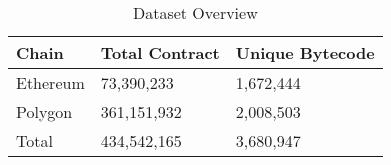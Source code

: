 \begin{table}[t]
	\centering
	\footnotesize
	\caption{Dataset Overview}
	\label{tab:dataset}
	\begin{tabularx}
		{0.6\linewidth}{@{}lRR@{}} \toprule \textbf{Chain} & \textbf{Total Contract} & \textbf{Unique
		Bytecode} \\ \midrule Ethereum & 73,390,233 & 1,672,444 \\ Polygon & 361,151,932 & 2,008,503
		\\ Total & 434,542,165 & 3,680,947 \\ \bottomrule
	\end{tabularx}
\end{table}
